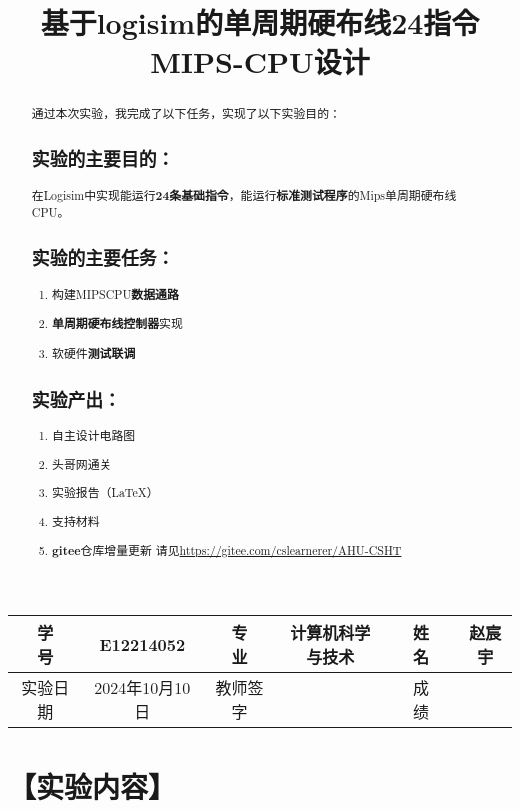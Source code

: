 \documentclass[withoutpreface]{cumcmthesis}
\title{基于logisim的单周期硬布线24指令MIPS-CPU设计}
\begin{document}
\maketitle
\begin{tabular}{cccccc}
	\hline
	学　　号 & E12214052 &专　　业 & 计算机科学与技术 &姓　　名 & 赵宸宇 \\
	\hline
	实验日期 & 2024年10月10日 &教师签字 &  &成　　绩&\\
	\hline
\end{tabular}
\begin{abstract}
	通过本次实验，我完成了以下任务，实现了以下实验目的：
	\subsection*{实验的主要目的：}
	
	在Logisim中实现能运行\textbf{24条基础指令}，能运行\textbf{标准测试程序}的Mips单周期硬布线CPU。
	
	\subsection*{实验的主要任务：}
	
	\begin{enumerate}
		\item 构建MIPSCPU\textbf{数据通路}
		\item \textbf{单周期硬布线控制器}实现
		\item 软硬件\textbf{测试联调}

	\end{enumerate}
	
	

\subsection*{实验产出：}
\begin{enumerate}
	\item 自主设计电路图
	\item 头哥网通关
	\item 实验报告（\LaTeX{}）
	\item 支持材料
	\item \textbf{gitee}仓库增量更新 请见\url{https://gitee.com/cslearnerer/AHU-CSHT}
\end{enumerate}
\end{abstract}
\tableofcontents
\newpage

\section{【实验内容】}
\end{document}
